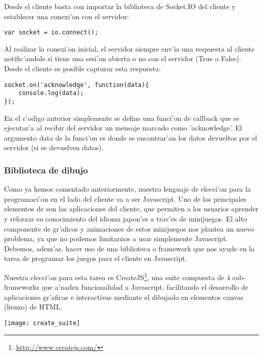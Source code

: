 Desde el cliente basta con importar la biblioteca de Socket.IO del cliente y establecer una conexi'on con el servidor:

\begin{verbatim}
var socket = io.connect();
\end{verbatim}

Al realizar la conexi'on inicial, el servidor siempre env'ia una respuesta al cliente notific'andole si tiene una
sesi'on abierta o no con el servidor (True o False). Desde el cliente es posible capturar esta respuesta:

\begin{verbatim}
socket.on('acknowledge', function(data){
    console.log(data);
});
\end{verbatim}

En el c'odigo anterior simplemente se define una funci'on de callback que se ejecutar'a al recibir del servidor un
mensaje marcado como 'acknowledge'. El argumento data de la funci'on es donde se encontrar'an los datos devueltos
por el servidor (si se devuelven datos).

\subsubsection{Biblioteca de dibujo}
\label{sub:biblioteca_de_dibujo}

Como ya hemos comentado anteriormente, nuestro lenguaje de elecci'on para la programaci'on en el
lado del cliente va a ser Javascript. 
Uno de los principales elementos de \Nipponline{} son las aplicaciones del cliente, que permiten a
los usuarios aprender y reforzar su conocimiento del idioma japon'es a trav'es de minijuegos. El
alto componente de gr'aficos y animaciones de estos minijuegos nos plantea un nuevo problema, ya
que no podemos limitarnos a usar simplemente Javascript. Debemos, adem'as, hacer uso de una
biblioteca o framework que nos ayude en la tarea de programar los juegos para el cliente en
Javascript.

Nuestra elecci'on para esta tarea es CreateJS\footnote{\url{http://www.createjs.com/}}, una suite compuesta de 4 
sub-frameworks que a'naden funcionalidad a Javascript, facilitando el desarrollo de aplicaciones
gr'aficas e interactivas mediante el dibujado en elementos canvas (lienzo) de HTML.

\begin{center}
\texttt{[image: create\_suite]}
\end{center}


